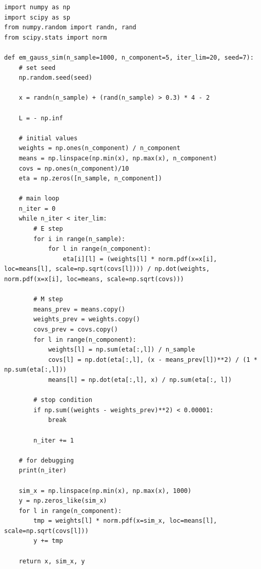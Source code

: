 \documentclass[11pt,a4paper,dvipdfmx]{article}
\theoremstyle{plain}
\newcommand{\1}{\mbox{1}\hspace{-0.25em}\mbox{l}}
\begin{document}
\begin{lstlisting}
import numpy as np
import scipy as sp
from numpy.random import randn, rand
from scipy.stats import norm

def em_gauss_sim(n_sample=1000, n_component=5, iter_lim=20, seed=7):
    # set seed
    np.random.seed(seed)

    x = randn(n_sample) + (rand(n_sample) > 0.3) * 4 - 2

    L = - np.inf

    # initial values
    weights = np.ones(n_component) / n_component
    means = np.linspace(np.min(x), np.max(x), n_component)
    covs = np.ones(n_component)/10
    eta = np.zeros([n_sample, n_component])

    # main loop
    n_iter = 0
    while n_iter < iter_lim:
        # E step
        for i in range(n_sample):
            for l in range(n_component):
                eta[i][l] = (weights[l] * norm.pdf(x=x[i], loc=means[l], scale=np.sqrt(covs[l]))) / np.dot(weights, norm.pdf(x=x[i], loc=means, scale=np.sqrt(covs)))

        # M step
        means_prev = means.copy()
        weights_prev = weights.copy()
        covs_prev = covs.copy()
        for l in range(n_component):
            weights[l] = np.sum(eta[:,l]) / n_sample
            covs[l] = np.dot(eta[:,l], (x - means_prev[l])**2) / (1 * np.sum(eta[:,l]))
            means[l] = np.dot(eta[:,l], x) / np.sum(eta[:, l])

        # stop condition
        if np.sum((weights - weights_prev)**2) < 0.00001:
            break

        n_iter += 1

    # for debugging
    print(n_iter)

    sim_x = np.linspace(np.min(x), np.max(x), 1000)
    y = np.zeros_like(sim_x)
    for l in range(n_component):
        tmp = weights[l] * norm.pdf(x=sim_x, loc=means[l], scale=np.sqrt(covs[l]))
        y += tmp

    return x, sim_x, y
\end{lstlisting}
\end{document}
